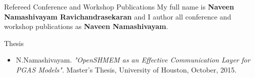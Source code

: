 \documentclass{resume}
\begin{document}

\begin{rSection}{Refereed Conference and Workshop Publications}
My full name is \textbf{Naveen Namashivayam Ravichandrasekaran} and I author all
conference and workshop publications as \textbf{Naveen Namashivayam}.

\end{rSection}

\begin{rSection}{Thesis}
\begin{itemize}
\item N.Namashivayam.
      \textit{"OpenSHMEM as an Effective Communication Layer for PGAS Models"}.
      Master's Thesis, University of Houston, October, 2015.
\end{itemize}
\end{rSection}
\end{document}
